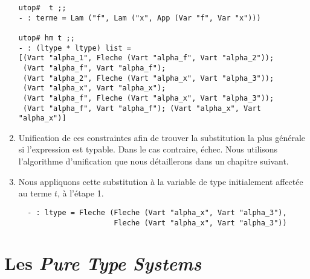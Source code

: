 \begin{enumerate}
\begin{Verbatim}
utop#  t ;;
- : terme = Lam ("f", Lam ("x", App (Var "f", Var "x")))

utop# hm t ;;
- : (ltype * ltype) list =
[(Vart "alpha_1", Fleche (Vart "alpha_f", Vart "alpha_2"));
 (Vart "alpha_f", Vart "alpha_f");
 (Vart "alpha_2", Fleche (Vart "alpha_x", Vart "alpha_3"));
 (Vart "alpha_x", Vart "alpha_x");
 (Vart "alpha_f", Fleche (Vart "alpha_x", Vart "alpha_3"));
 (Vart "alpha_f", Vart "alpha_f"); (Vart "alpha_x", Vart "alpha_x")]
\end{Verbatim}
    
  \item Unification de ces constraintes afin de trouver la substitution la plus générale si l'expression est typable. 
  Dans le cas contraire, échec. Nous utilisons l'algorithme d'unification que nous détaillerons dans un chapitre suivant.

  \item Nous appliquons cette substitution à la variable de type initialement affectée au terme $t$, à l'étape 1.
\begin{Verbatim}
  - : ltype = Fleche (Fleche (Vart "alpha_x", Vart "alpha_3"),
                      Fleche (Vart "alpha_x", Vart "alpha_3"))
\end{Verbatim}
\end{enumerate}

\section{Les \textit{Pure Type Systems}}
